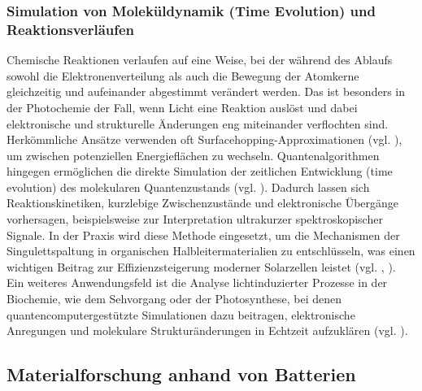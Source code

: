 \subsubsection{Simulation von Moleküldynamik (Time Evolution) und Reaktionsverläufen}


Chemische Reaktionen verlaufen auf eine Weise, bei der während des Ablaufs sowohl die Elektronenverteilung als auch die Bewegung der Atomkerne gleichzeitig und aufeinander abgestimmt verändert werden. Das ist besonders in der Photochemie der Fall, wenn Licht eine Reaktion auslöst und dabei elektronische und strukturelle Änderungen eng miteinander verflochten sind. Herkömmliche Ansätze verwenden oft Surfacehopping-Approximationen (vgl. \cite{barbattiNonadiabaticDynamicsTrajectory2011}), um zwischen potenziellen Energieflächen zu wechseln. Quantenalgorithmen hingegen ermöglichen die direkte Simulation der zeitlichen Entwicklung (time evolution) des molekularen Quantenzustands (vgl. \cite{bauer_quantum_2020}). Dadurch lassen sich Reaktionskinetiken, kurzlebige Zwischenzustände und elektronische Übergänge vorhersagen, beispielsweise zur Interpretation ultrakurzer spektroskopischer Signale.
In der Praxis wird diese Methode eingesetzt, um die Mechanismen der Singulettspaltung in organischen Halbleitermaterialien zu entschlüsseln, was einen wichtigen Beitrag zur Effizienzsteigerung moderner Solarzellen leistet (vgl. \cite{motlagh_quantum_2025}, \cite{baldacchino_singlet_2022}). Ein weiteres Anwendungsfeld ist die Analyse lichtinduzierter Prozesse in der Biochemie, wie dem Sehvorgang oder der Photosynthese, bei denen quantencomputergestützte Simulationen dazu beitragen, elektronische Anregungen und molekulare Strukturänderungen in Echtzeit aufzuklären (vgl. \cite{macdonell_predicting_2023}).


\subsection{Materialforschung anhand von Batterien}

